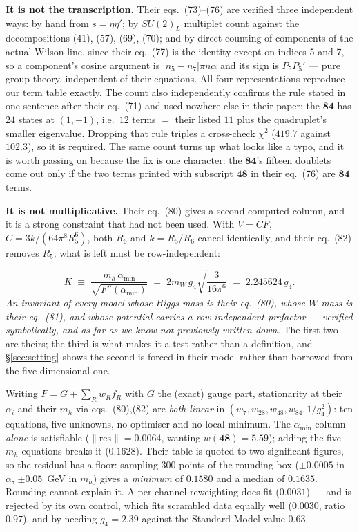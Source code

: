 \documentclass[11pt,a4paper]{article}
\newcommand{\su}[1]{SU(#1)}
\newcommand{\rep}[1]{\mathbf{#1}}
\newcommand{\amin}{\alpha_{\min}}
\newenvironment{keyeq}
  {\begin{center}\setlength{\fboxsep}{9pt}\setlength{\fboxrule}{0.8pt}%
   \begin{lrbox}{\keyeqbox}\begin{minipage}{0.88\textwidth}}
  {\end{minipage}\end{lrbox}%
   \fcolorbox{hdrblue!55}{hdrblue!6}{\usebox{\keyeqbox}}\end{center}}
\begin{document}
\textbf{It is not the transcription.} Their eqs.~(73)--(76) are verified three independent ways: by
hand from $s=\eta\eta'$; by $\su2_L$ multiplet count against the decompositions (41), (57), (69),
(70); and by direct counting of components of the actual Wilson line, since their eq.~(77) is the
identity except on indices 5 and 7, so a component's cosine argument is $|n_5-n_7|\pi n\alpha$ and
its sign is $P_5P_5'$ --- pure group theory, independent of their equations. All four
representations reproduce our term table exactly. The count also independently confirms the rule
stated in one sentence after their eq.~(71) and used nowhere else in their paper: the $\rep{84}$ has
$24$ states at $(1,-1)$, i.e.\ $12$ terms $=$ their listed $11$ plus the quadruplet's smaller
eigenvalue. Dropping that rule triples a cross-check $\chi^2$ ($419.7$ against $102.3$), so it is
required. The same count turns up what looks like a typo, and it is worth passing on because the fix
is one character: the $\rep{84}$'s fifteen doublets come
out only if the two terms printed with subscript $\rep{48}$ in their eq.~(76) are $\rep{84}$ terms.

\textbf{It is not multiplicative.} Their eq.~(80) gives a second computed column, and it is a strong
constraint that had not been used. With $V=CF$, $C=3k/(64\pi^8R_5^6)$, both $R_6$ and $k=R_5/R_6$
cancel identically, and their eq.~(82) removes $R_5$; what is left must be row-independent:
\begin{keyeq}
\begin{equation}\label{eq:K}
K\;\equiv\;\frac{m_h\,\amin}{\sqrt{F''(\amin)}}\;=\;2m_W\,g_4\sqrt{\frac{3}{16\pi^6}}\;=\;2.245624\,g_4 .
\end{equation}
\emph{An invariant of every model whose Higgs mass is their eq.~(80), whose $W$ mass is their
eq.~(81), and whose potential carries a row-independent prefactor --- verified symbolically, and as
far as we know not previously written down.} The first two are theirs; the third is what makes it a
test rather than a definition, and \S\ref{sec:setting} shows the second is forced in their model
rather than borrowed from the five-dimensional one.
\end{keyeq}
Writing $F=G+\sum_R w_R f_R$ with $G$ the (exact) gauge part, stationarity at their $\alpha_i$ and
their $m_h$ via eqs.~(80),(82) are \emph{both linear} in $(w_7,w_{28},w_{48},w_{84},1/g_4^2)$: ten
equations, five unknowns, no optimiser and no local minimum. The $\amin$ column \emph{alone} is
satisfiable ($\|\mathrm{res}\|=0.0064$, wanting $w(\rep{48})=5.59$); adding the five $m_h$ equations
breaks it ($0.1628$). Their table is quoted to two significant figures, so the residual has a floor:
sampling $300$ points of the rounding box ($\pm0.0005$ in $\alpha$, $\pm0.05$~GeV in $m_h$) gives a
\emph{minimum} of $0.1580$ and a median of $0.1635$. Rounding cannot explain it. A per-channel
reweighting does fit ($0.0031$) --- and is rejected by its own control, which fits scrambled data
equally well ($0.0030$, ratio $0.97$), and by needing $g_4=2.39$ against the Standard-Model value
$0.63$.
\end{document}
